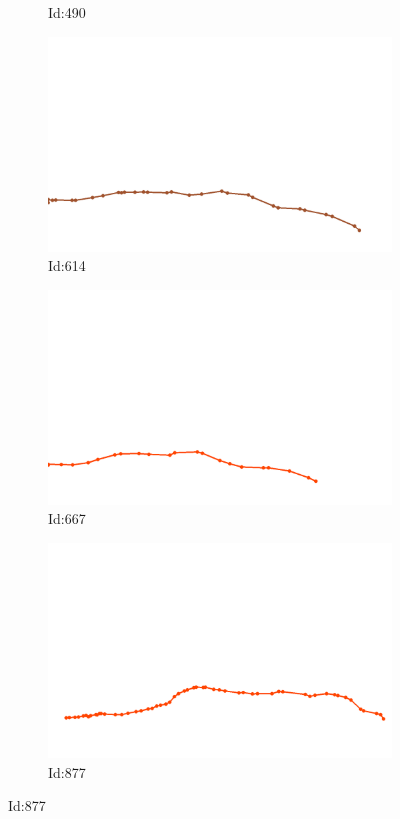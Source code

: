 \documentclass[12pt,twoside]{report}
\begin{document}
\begin{figure}
\begin{subfigure}[b]{0.20\textwidth}
\caption{Id:490}
\end{subfigure}
\begin{subfigure}[b]{0.20\textwidth}
\centering
\includegraphics[width=\textwidth]{../../trajectories/614.png}
\caption{Id:614}
\end{subfigure}
\begin{subfigure}[b]{0.20\textwidth}
\centering
\includegraphics[width=\textwidth]{../../trajectories/667.png}
\caption{Id:667}
\end{subfigure}
\begin{subfigure}[b]{0.20\textwidth}
\centering
\includegraphics[width=\textwidth]{../../trajectories/877.png}
\caption{Id:877}
\end{subfigure}
\end{figure}
\end{document}
